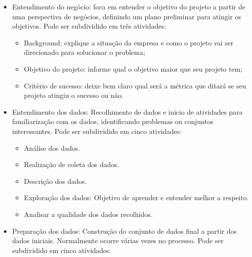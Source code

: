 \documentclass[]{article}
\providecommand{\tightlist}{%
  \setlength{\itemsep}{0pt}\setlength{\parskip}{0pt}}
\begin{document}
\begin{itemize}
\item
  Entendimento do negócio: foca em entender o objetivo do projeto a
  partir de uma perspectiva de negócios, definindo um plano preliminar
  para atingir os objetivos. Pode ser subdividido em três atividades:

  \begin{itemize}
  \tightlist
  \item
    Background: explique a situação da empresa e como o projeto vai ser
    direcionado para solucionar o problema;
  \item
    Objetivo do projeto: informe qual o objetivo maior que seu projeto
    tem;
  \item
    Critério de sucesso: deixe bem claro qual será a métrica que ditará
    se seu projeto atingiu o sucesso ou não.
  \end{itemize}
\item
  Entendimento dos dados: Recolhimento de dados e inicio de atividades
  para familiarização com os dados, identificando problemas ou conjuntos
  interessantes. Pode ser subdividido em cinco atividades:

  \begin{itemize}
  \tightlist
  \item
    Análise dos dados.
  \item
    Realização de coleta dos dados.
  \item
    Descrição dos dados.
  \item
    Exploração dos dados: Objetivo de aprender e entender melhor a
    respeito.
  \item
    Analisar a qualidade dos dados recolhidos.
  \end{itemize}
\item
  Preparação dos dados: Construção do conjunto de dados final a partir
  dos dados iniciais. Normalmente ocorre várias vezes no processo. Pode
  ser subdividido em cinco atividades:


\end{itemize}
\end{document}
